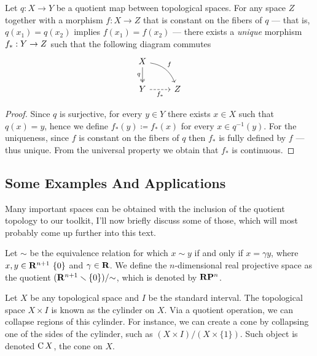 \begin{theorem}
\label{thm:Top-quotient-descent}
Let \(q: X \to Y\) be a quotient map between topological spaces. For any space
\(Z\) together with a morphism \(f: X \to Z\) that is constant on the fibers of
\(q\) --- that is, \(q(x_1) = q(x_2)\) implies \(f(x_1) = f(x_2)\) --- there
exists a \emph{unique} morphism \(f_{*}: Y \to Z\) such that the following
diagram commutes
\[
\begin{tikzcd}
X \ar[d, two heads, "q", swap] \ar[dr, bend left, "f"] & \\
Y \ar[r, dashed, swap, "f_{*}"] &Z
\end{tikzcd}
\]
\end{theorem}

\begin{proof}
Since \(q\) is surjective, for every \(y \in Y\) there exists \(x \in X\) such
that \(q(x) = y\), hence we define \(f_{*}(y) \coloneq f_{*}(x)\) for every
\(x \in q^{-1}(y)\). For the uniqueness, since \(f\) is constant on the fibers
of \(q\) then \(f_{*}\) is fully defined by \(f\) --- thus unique. From the
universal property we obtain that \(f_{*}\) is continuous.
\end{proof}

\subsection{Some Examples And Applications}

Many important spaces can be obtained with the inclusion of the quotient
topology to our toolkit, I'll now briefly discuss some of those, which will most
probably come up further into this text.

\begin{example}\label{exp:real-projective-space}
Let \(\sim\) be the equivalence relation for which \(x \sim y\) if and only if
\(x = \gamma y\), where \(x, y \in \mathbf{R}^{n+1} \ \{0\}\) and \(\gamma \in \mathbf{R}\). We
define the \(n\)-dimensional real projective space as the quotient \((\mathbf{R}^{n+1}
\smallsetminus \{0\})/{\sim}\), which is denoted by \(\mathbf{R} \mathbf{P}^{n}\).
\end{example}

\begin{definition}[Cone]\label{def:cone}
Let \(X\) be any topological space and \(I\) be the standard interval. The
topological space \(X \times I\) is known as the cylinder on \(X\). Via a
quotient operation, we can collapse regions of this cylinder. For instance,
we can create a cone by collapsing one of the sides of the cylinder, such as
\((X \times I) / (X \times \{1\})\). Such object is denoted \(\operatorname{C} X\), the
cone on \(X\).
\end{definition}

